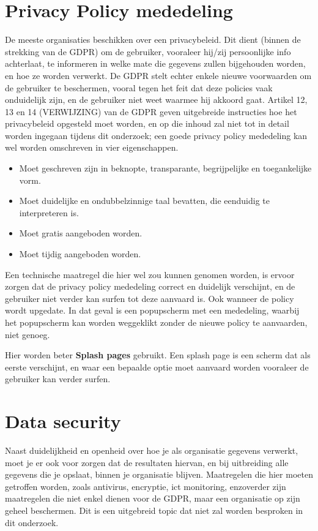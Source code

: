 \section{Privacy Policy mededeling}
De meeste organisaties beschikken over een privacybeleid. Dit dient (binnen de strekking van de GDPR) om de gebruiker, vooraleer hij/zij persoonlijke info achterlaat, te informeren in welke mate die gegevens zullen bijgehouden worden, en hoe ze worden verwerkt. De GDPR stelt echter enkele nieuwe voorwaarden om de gebruiker te beschermen, vooral tegen het feit dat deze policies vaak onduidelijk zijn, en de gebruiker niet weet waarmee hij akkoord gaat.
Artikel 12, 13 en 14 (VERWIJZING) van de GDPR geven uitgebreide instructies hoe het privacybeleid opgesteld moet worden, en op die inhoud zal niet tot in detail worden ingegaan tijdens dit onderzoek; een goede privacy policy mededeling kan wel worden omschreven in vier eigenschappen. 

\begin{itemize}
	\item Moet geschreven zijn in beknopte, transparante, begrijpelijke en toegankelijke vorm.
	\item Moet duidelijke en ondubbelzinnige taal bevatten, die eenduidig te interpreteren is. 
	\item Moet gratis aangeboden worden.
	\item Moet tijdig aangeboden worden.
\end{itemize}

Een technische maatregel die hier wel zou kunnen genomen worden, is ervoor zorgen dat de privacy policy mededeling correct en duidelijk verschijnt, en de gebruiker niet verder kan surfen tot deze aanvaard is. 
Ook wanneer de policy wordt upgedate. In dat geval is een popupscherm met een mededeling, waarbij het popupscherm kan worden weggeklikt zonder de nieuwe policy te aanvaarden, niet genoeg. 

Hier worden beter \textbf{Splash pages} gebruikt. Een splash page is een scherm dat als eerste verschijnt, en waar een bepaalde optie moet aanvaard worden vooraleer de gebruiker kan verder surfen. 

\section{Data security}

Naast duidelijkheid en openheid over hoe je als organisatie gegevens verwerkt, moet je er ook voor zorgen dat de resultaten hiervan, en bij uitbreiding alle gegevens die je opslaat, binnen je organisatie blijven.
Maatregelen die hier moeten getroffen worden, zoals antivirus, encryptie, ict monitoring, enzoverder zijn maatregelen die niet enkel dienen voor de GDPR, maar een organisatie op zijn geheel beschermen. 
Dit is een uitgebreid topic dat niet zal worden besproken in dit onderzoek. 

